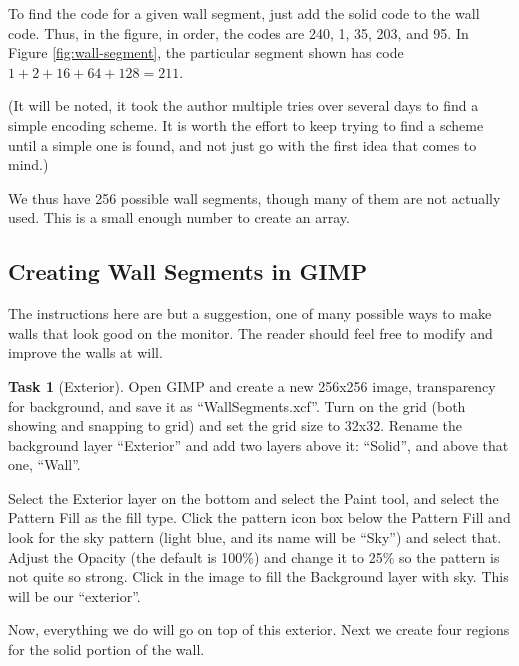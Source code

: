 \documentclass[12pt]{amsbook}
\theoremstyle{definition}
\newtheorem{task}[exercise]{Task}
\theoremstyle{remark}
\numberwithin{figure}{chapter}
\numberwithin{table}{chapter}
\numberwithin{section}{chapter}
\numberwithin{equation}{section}
\begin{document}
To find the code for a given wall segment, just add the solid code to the wall code.  Thus, in the figure, in order, the codes are 240, 1, 35, 203, and 95.  In Figure \ref{fig:wall-segment}, the particular segment shown has code $1+2+16+64+128=211$.

(It will be noted, it took the author multiple tries over several days to find a simple encoding scheme.  It is worth the effort to keep trying to find a scheme until a simple one is found, and not just go with the first idea that comes to mind.)

We thus have 256 possible wall segments, though many of them are not actually used.  This is a small enough number to create an array.

\subsection{Creating Wall Segments in GIMP}

The instructions here are but a suggestion, one of many possible ways to make walls that look good on the monitor.  The reader should feel free to modify and improve the walls at will.

\begin{task}[Exterior]
Open GIMP and create a new 256x256 image, transparency for background, and save it as ``WallSegments.xcf''. Turn on the grid (both showing and snapping to grid) and set the grid size to 32x32.  Rename the background layer ``Exterior'' and add two layers above it: ``Solid'', and above that one, ``Wall''.

Select the Exterior layer on the bottom and select the Paint tool, and select the Pattern Fill as the fill type.  Click the pattern icon box below the Pattern Fill and look for the sky pattern (light blue, and its name will be ``Sky'') and select that.  Adjust the Opacity (the default is 100\%) and change it to 25\% so the pattern is not quite so strong.  Click in the image to fill the Background layer with sky.  This will be our ``exterior''.
\end{task}

Now, everything we do will go on top of this exterior.  Next we create four regions for the solid portion of the wall.
\end{document}
